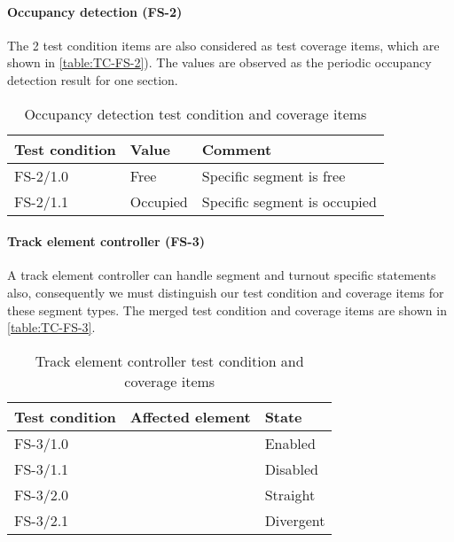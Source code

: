 \paragraph{Occupancy detection (FS-2)}
The 2 test condition items are also considered as test coverage items, which are shown in \autoref{table:TC-FS-2}). The values are observed as the periodic occupancy detection result for one section.
\begin{table}[H]
	\caption{Occupancy detection test condition and coverage items}
	\label{table:TC-FS-2}
	\begin{center}
		\renewcommand{\arraystretch}{1.8}
		\begin{tabu} 
			to 0.9 \textwidth
			{  X[c] X[c] X[c] }
			\toprule
			Test condition & Value    & Comment             \\ \midrule
			FS-2/1.0       & Free     & Specific segment is free     \\
			FS-2/1.1       & Occupied & Specific segment is occupied \\ \bottomrule
		\end{tabu}
	\end{center}
\end{table}


\paragraph{Track element controller (FS-3)}
A track element controller can handle segment and turnout specific statements also, consequently we must distinguish our test condition and coverage items for these segment types. The merged test condition and coverage items are shown in \autoref{table:TC-FS-3}.
\begin{table}[H]
	\caption{Track element controller test condition and coverage items}
	\label{table:TC-FS-3}
	\begin{center}
		\renewcommand{\arraystretch}{1.8}
		\begin{tabu} 
			to 0.9 \textwidth
			{  X[c] X[c] X[c] }
			\toprule
			Test condition & Affected element               & State     \\ \midrule
			FS-3/1.0       &  & Enabled   \\
			FS-3/1.1       &                                & Disabled  \\
			FS-3/2.0       &  & Straight  \\
			FS-3/2.1       &                                & Divergent \\ \bottomrule
		\end{tabu}
	\end{center}
\end{table} 

